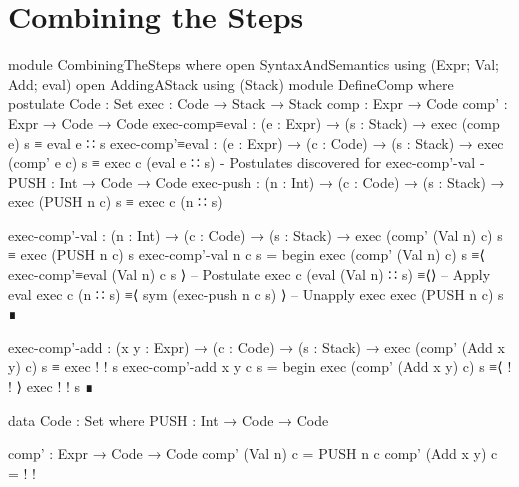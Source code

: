 \documentclass{article}
\begin{document}
\section{Combining the Steps}

\begin{code}
module CombiningTheSteps where
  open SyntaxAndSemantics using (Expr; Val; Add; eval)
  open AddingAStack using (Stack)
  module DefineComp where
    postulate
      Code : Set
      exec : Code → Stack → Stack
      comp : Expr → Code
      comp' : Expr → Code → Code
      exec-comp≡eval : (e : Expr) → (s : Stack)
        → exec (comp e) s ≡ eval e ∷ s
      exec-comp'≡eval : (e : Expr) → (c : Code) → (s : Stack)
        → exec (comp' e c) s ≡ exec c (eval e ∷ s)
      {- Postulates discovered for exec-comp'-val -}
      PUSH : Int → Code → Code
      exec-push : (n : Int) → (c : Code) → (s : Stack)
        → exec (PUSH n c) s ≡ exec c (n ∷ s)

    exec-comp'-val : (n : Int) → (c : Code) → (s : Stack)
      → exec (comp' (Val n) c) s ≡ exec (PUSH n c) s
    exec-comp'-val n c s =
      begin
        exec (comp' (Val n) c) s
      ≡⟨ exec-comp'≡eval (Val n) c s ⟩ -- Postulate
        exec c (eval (Val n) ∷ s)
      ≡⟨⟩ -- Apply eval
        exec c (n ∷ s)
      ≡⟨ sym (exec-push n c s) ⟩ -- Unapply exec
        exec (PUSH n c) s
      ∎

    exec-comp'-add : (x y : Expr) → (c : Code) → (s : Stack)
      → exec (comp' (Add x y) c) s ≡ exec {!   !} s
    exec-comp'-add x y c s =
      begin
        exec (comp' (Add x y) c) s
      ≡⟨ {!   !} ⟩
        exec {!   !} s
      ∎
  
  data Code : Set where
    PUSH : Int → Code → Code

  comp' : Expr → Code → Code
  comp' (Val n) c = PUSH n c
  comp' (Add x y) c = {!   !}
\end{code}
\end{document}
